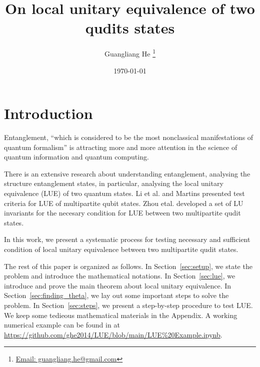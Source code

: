 \documentclass{article}
\title{On local unitary equivalence of two qudits states}
\author{Guangliang He
  \thanks{\href{mailto:guangliang.he@gmail.com}
    {Email: guangliang.he@gmail.com}}}
\date{\today}
\begin{document}
\maketitle

\section{Introduction}
Entanglement, ``which is considered to be the most nonclassical
manifestations of quantum formalism''\cite{Horodecki_2009}
is attracting more and more attention in the science of quantum
information and quantum computing.

There is an extensive research about understanding entanglement,
analysing the structure entanglement states, in particular,
analysing the local unitary equivalence (LUE) of two quantum states.
Li et al.\cite{Li_2014} and Martins\cite{Martins_2015} presented
test criteria for LUE of multipartite qubit states.
Zhou etal.\cite{Zhou_2024} developed a set of LU invariants for
the necesary condition for LUE between two multipartite qudit states.

In this work, we present a systematic process for testing
necessary and sufficient condition of local unitary equivalence
between two multipartite qudit states.

The rest of this paper is organized as follows. In
Section~\ref{sec:setup}, we state the problem and introduce the
mathematical notations.  In Section~\ref{sec:lue}, we introduce
and prove the main theorem about local unitary equivalence.
In Section~\ref{sec:finding_theta}, we lay out some important
steps to solve the problem.  In Section~\ref{sec:steps}, we
present a step-by-step procedure to test LUE.  We keep some
tedieous mathematical materials in the Appendix.  A working
numerical example can be found in at \href{https://github.com/ghe2014/LUE/blob/main/LUE\%20Example.ipynb}{https://github.com/ghe2014/LUE/blob/main/LUE\%20Example.ipynb}.
\end{document}
